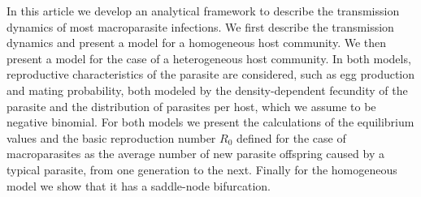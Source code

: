 \documentclass[12pt,a4paper]{article}
\theoremstyle{plain}%
\theoremstyle{definition}
\theoremstyle{remark}
\begin{document}
{ 	In this article we develop an analytical framework to describe the transmission dynamics of most macroparasite infections.
 	We first describe the transmission dynamics and present a model for a homogeneous host community. We then present a model for the case of a heterogeneous host community. In both models, reproductive characteristics of the parasite are considered, such as egg production and mating probability, both modeled by the density-dependent fecundity of the parasite and the distribution of parasites per host, which we assume to be negative binomial.	
 	For both models we present the calculations of the equilibrium values and the basic reproduction number $R_0$ defined for the case of macroparasites as the average number of new parasite offspring caused by a typical parasite, from one generation to the next.
 	Finally for the homogeneous model we show that it has a saddle-node bifurcation.
 	
 		
 	
%
 	}
\end{document}
